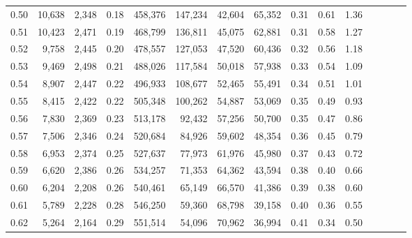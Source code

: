 \begin{tabular}{rrrcrrrrrrrrrrr}
0.50 &  10,638 &  2,348 &                                       0.18 &  458,376 &  147,234 &   42,604 &   65,352 &  0.31 &  0.61 &                         1.36 \\
0.51 &  10,423 &  2,471 &                                       0.19 &  468,799 &  136,811 &   45,075 &   62,881 &  0.31 &  0.58 &                         1.27 \\
0.52 &   9,758 &  2,445 &                                       0.20 &  478,557 &  127,053 &   47,520 &   60,436 &  0.32 &  0.56 &                         1.18 \\
0.53 &   9,469 &  2,498 &                                       0.21 &  488,026 &  117,584 &   50,018 &   57,938 &  0.33 &  0.54 &                         1.09 \\
0.54 &   8,907 &  2,447 &                                       0.22 &  496,933 &  108,677 &   52,465 &   55,491 &  0.34 &  0.51 &                         1.01 \\
0.55 &   8,415 &  2,422 &                                       0.22 &  505,348 &  100,262 &   54,887 &   53,069 &  0.35 &  0.49 &                         0.93 \\
0.56 &   7,830 &  2,369 &                                       0.23 &  513,178 &   92,432 &   57,256 &   50,700 &  0.35 &  0.47 &                         0.86 \\
0.57 &   7,506 &  2,346 &                                       0.24 &  520,684 &   84,926 &   59,602 &   48,354 &  0.36 &  0.45 &                         0.79 \\
0.58 &   6,953 &  2,374 &                                       0.25 &  527,637 &   77,973 &   61,976 &   45,980 &  0.37 &  0.43 &                         0.72 \\
0.59 &   6,620 &  2,386 &                                       0.26 &  534,257 &   71,353 &   64,362 &   43,594 &  0.38 &  0.40 &                         0.66 \\
0.60 &   6,204 &  2,208 &                                       0.26 &  540,461 &   65,149 &   66,570 &   41,386 &  0.39 &  0.38 &                         0.60 \\
0.61 &   5,789 &  2,228 &                                       0.28 &  546,250 &   59,360 &   68,798 &   39,158 &  0.40 &  0.36 &                         0.55 \\
0.62 &   5,264 &  2,164 &                                       0.29 &  551,514 &   54,096 &   70,962 &   36,994 &  0.41 &  0.34 &                         0.50 \\

\end{tabular}

